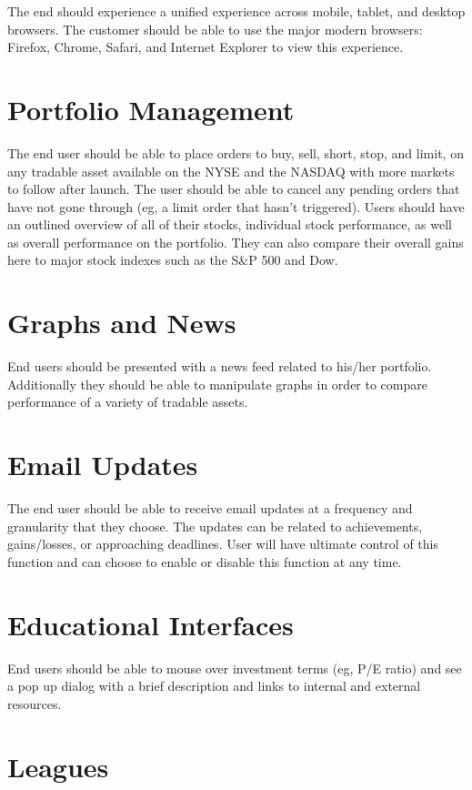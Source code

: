 \documentclass[11pt,letterpaper,oneside]{memoir}
\begin{document}
The end should experience a unified experience across mobile, tablet, and
desktop browsers. The customer should be able to use the major modern browsers:
Firefox, Chrome, Safari, and Internet Explorer to view this experience.

\section{Portfolio Management}

The end user should be able to place orders to buy, sell, short, stop, and
limit, on any tradable asset available on the NYSE and the NASDAQ with more
markets to follow after launch. The user should be able to cancel any pending
orders that have not gone through (eg, a limit order that hasn't triggered).
Users should have an outlined overview of all of their stocks, individual stock
performance, as well as overall performance on the portfolio. They can also
compare their overall gains here to major stock indexes such as the S\&P 500 and
Dow.

\section{Graphs and News}

End users should be presented with a news feed related to his/her portfolio.
Additionally they should be able to manipulate graphs in order to compare
performance of a variety of tradable assets.

\section{Email Updates}

The end user should be able to receive email updates at a frequency and
granularity that they choose.  The updates can be related to achievements,
gains/losses, or approaching deadlines. User will have ultimate control of this
function and can choose to enable or disable this function at any time.

\section{Educational Interfaces}

End users should be able to mouse over investment terms (eg, P/E ratio) and see
a pop up dialog with a brief description and links to internal and external
resources.

\section{Leagues}
\end{document}
